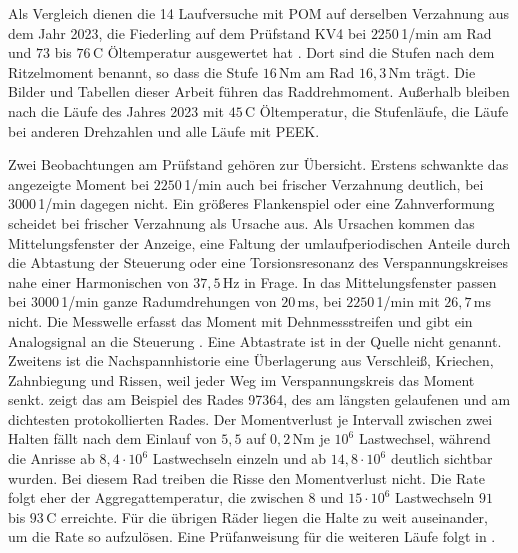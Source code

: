 Als Vergleich dienen die 14 Laufversuche mit POM auf derselben Verzahnung aus dem Jahr 2023, die Fiederling auf dem Prüfstand KV4 bei $2250$\,1/min am Rad und $73$ bis $76$\,\textdegree C Öltemperatur ausgewertet hat \cite[S.~43 und 65]{Fie23}. Dort sind die Stufen nach dem Ritzelmoment benannt, so dass die Stufe $16$\,Nm am Rad $16{,}3$\,Nm trägt. Die Bilder und Tabellen dieser Arbeit führen das Raddrehmoment. Außerhalb bleiben nach  die Läufe des Jahres 2023 mit $45$\,\textdegree C Öltemperatur, die Stufenläufe, die Läufe bei anderen Drehzahlen und alle Läufe mit PEEK.

Zwei Beobachtungen am Prüfstand gehören zur Übersicht. Erstens schwankte das angezeigte Moment bei $2250$\,1/min auch bei frischer Verzahnung deutlich, bei $3000$\,1/min dagegen nicht. Ein größeres Flankenspiel oder eine Zahnverformung scheidet bei frischer Verzahnung als Ursache aus. Als Ursachen kommen das Mittelungsfenster der Anzeige, eine Faltung der umlaufperiodischen Anteile durch die Abtastung der Steuerung oder eine Torsionsresonanz des Verspannungskreises nahe einer Harmonischen von $37{,}5$\,Hz in Frage. In das Mittelungsfenster passen bei $3000$\,1/min ganze Radumdrehungen von $20$\,ms, bei $2250$\,1/min mit $26{,}7$\,ms nicht. Die Messwelle erfasst das Moment mit Dehnmessstreifen und gibt ein Analogsignal an die Steuerung \cite[S.~52]{Schu09}. Eine Abtastrate ist in der Quelle nicht genannt. Zweitens ist die Nachspannhistorie eine Überlagerung aus Verschleiß, Kriechen, Zahnbiegung und Rissen, weil jeder Weg im Verspannungskreis das Moment senkt.  zeigt das am Beispiel des Rades 97364, des am längsten gelaufenen und am dichtesten protokollierten Rades. Der Momentverlust je Intervall zwischen zwei Halten fällt nach dem Einlauf von $5{,}5$ auf $0{,}2$\,Nm je $10^{6}$ Lastwechsel, während die Anrisse ab $8{,}4 \cdot 10^{6}$ Lastwechseln einzeln und ab $14{,}8 \cdot 10^{6}$ deutlich sichtbar wurden. Bei diesem Rad treiben die Risse den Momentverlust nicht. Die Rate folgt eher der Aggregattemperatur, die zwischen $8$ und $15 \cdot 10^{6}$ Lastwechseln $91$ bis $93$\,\textdegree C erreichte. Für die übrigen Räder liegen die Halte zu weit auseinander, um die Rate so aufzulösen. Eine Prüfanweisung für die weiteren Läufe folgt in .


